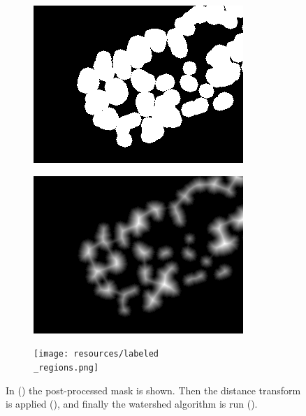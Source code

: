 \documentclass[
  digital,     %
  oneside,     %
  nosansbold,  %
  nocolorbold, %
  lof,         %
  lot,         %
]{fithesis4}
\begin{document}
\begin{figure}
    \begin{subfigure}[t]{0.48\textwidth}
        \centering
        \includegraphics[width=\textwidth]{resources/post-processed-mask.png}
        \caption{}
        \label{fig:dist-processed-mask}
    \end{subfigure}
    \begin{subfigure}[t]{0.48\textwidth}
        \centering
        \includegraphics[width=\textwidth]{resources/distance-map.png}
        \caption{}
        \label{fig:dist-map}
    \end{subfigure}
    \begin{subfigure}[t]{0.48\textwidth}
        \centering
        \texttt{[image: resources/labeled\\\_regions.png]}
        \caption{}
        \label{fig:dist-regions}
    \end{subfigure}
    \caption{In () the post-processed mask is
    shown. Then the distance transform is applied (), and
    finally the watershed algorithm is run ().}
    \label{fig:distance_map}
\end{figure}
\end{document}
